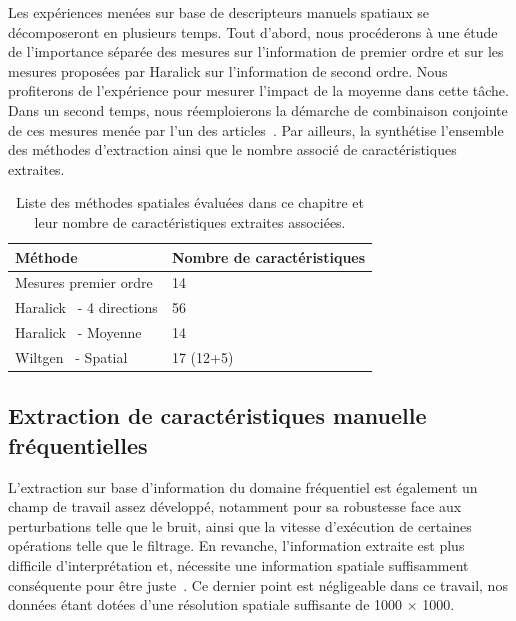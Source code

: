 Les expériences menées sur base de descripteurs manuels spatiaux se décomposeront en plusieurs temps. Tout d'abord, nous procéderons à une étude de l'importance séparée des mesures sur l'information de premier ordre et sur les mesures proposées par Haralick sur l'information de second ordre. Nous profiterons de l'expérience pour mesurer l'impact de la moyenne dans cette tâche. Dans un second temps, nous réemploierons la démarche de combinaison conjointe de ces mesures menée par l'un des articles~\cite{Wiltgen2008}. Par ailleurs, la  synthétise l'ensemble des méthodes d'extraction ainsi que le nombre associé de caractéristiques extraites.\par
\begin{table}[h]
    \centering
    \begin{tabular}{ll}
        \toprule
        \textbf{Méthode}                            & \textbf{Nombre de caractéristiques}   \\ \hline
        Mesures premier ordre                       & 14                                    \\ \hline
        Haralick~\cite{Haralick1973} - 4 directions & 56                                    \\ \hline
        Haralick~\cite{Haralick1973} - Moyenne      & 14                                    \\ \hline
        Wiltgen~\cite{Wiltgen2008} - Spatial        & 17 (12+5)                             \\
        \bottomrule                 
    \end{tabular}
    \caption{Liste des méthodes spatiales évaluées dans ce chapitre et leur nombre de caractéristiques extraites associées.}
    \label{tab:number_features_spatial}
\end{table}

\subsection{Extraction de caractéristiques manuelle fréquentielles}
L'extraction sur base d'information du domaine fréquentiel est également un champ de travail assez développé, notamment pour sa robustesse face aux perturbations telle que le bruit, ainsi que la vitesse d'exécution de certaines opérations telle que le filtrage. En revanche, l'information extraite est plus difficile d'interprétation et, nécessite une information spatiale suffisamment conséquente pour être juste~\cite{Kamila2015}. Ce dernier point est négligeable dans ce travail, nos données étant dotées d'une résolution spatiale suffisante de \SI{1000}{\px} $\times$ \SI{1000}{\px}.\par

